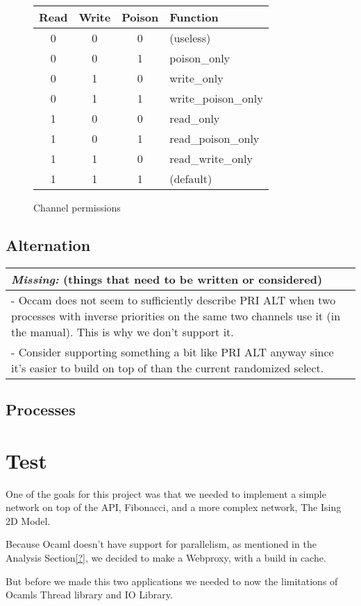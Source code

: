 \documentclass[a4paper,12pt]{article}
\newcommand{\missing}[1]{
  \begin{tabular}{|p{11cm}|}
    \hline
    \emph{Missing:} {\scriptsize (things that need to be written or considered)} \\
    \hline
    #1
    \hline
  \end{tabular}
}
\begin{document}
\begin{figure}[h]
\centering
\begin{tabular}{c|c|c|l}
Read & Write & Poison & Function \\
\hline
0 & 0 & 0 & (useless) \\
0 & 0 & 1 & poison\_only \\
0 & 1 & 0 & write\_only \\
0 & 1 & 1 & write\_poison\_only \\
1 & 0 & 0 & read\_only \\
1 & 0 & 1 & read\_poison\_only \\
1 & 1 & 0 & read\_write\_only \\
1 & 1 & 1 & (default) \\
\end{tabular}
\caption{Channel permissions}
\label{channel-permissions}
\end{figure}

\subsection{Alternation}

\missing{
- Occam does not seem to sufficiently describe PRI ALT when two processes with inverse priorities
on the same two channels use it (in the manual). This is why we don't support it. \\
- Consider supporting something a bit like PRI ALT anyway since it's easier to build on top of
than the current randomized select. \\
}

\subsection{Processes}

\section{Test}
\label{test}
One of the goals for this project was that we needed to implement a simple
network on top of the API, Fibonacci, and a more complex network, The Ising 2D
Model.

Because Ocaml doesn't have support for parallelism, as mentioned in the Analysis
Section\ref{?}, we decided to make a Webproxy, with a build in cache.

But before we made this two applications we needed to now the limitations of
Ocamls Thread library and IO Library.
\end{document}
